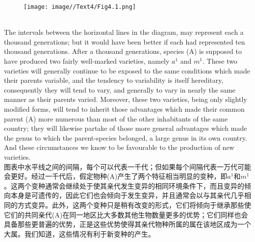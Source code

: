 \documentclass{article}
\begin{document}
\begin{figure}
    \centering
    \texttt{[image: image//Text4/Fig4.1.png]}
\end{figure}

\\
The intervals between the horizontal lines in the diagram, may represent each a thousand generations; but it would have been better if each had represented ten thousand generations. After a thousand generations, species (A) is supposed to have produced two fairly well-marked varieties, namely $a^1$ and $m^1$. These two varieties will generally continue to be exposed to the same conditions which made their parents variable, and the tendency to variability is itself hereditary, consequently they will tend to vary, and generally to vary in nearly the same manner as their parents varied. Moreover, these two varieties, being only slightly modified forms, will tend to inherit those advantages which made their common parent (A) more numerous than most of the other inhabitants of the same country; they will likewise partake of those more general advantages which made the genus to which the parent-species belonged, a large genus in its own country. And these circumstances we know to be favourable to the production of new varieties.\\
图表中水平线之间的间隔，每个可以代表一千代；但如果每个间隔代表一万代可能会更好。经过一千代后，假定物种(A)产生了两个特征相当明显的变种，即$a^1$和$m^1$。这两个变种通常会继续处于使其亲代发生变异的相同环境条件下，而且变异的倾向本身是可遗传的，因此它们也会倾向于发生变异，并且通常会以与其亲代几乎相同的方式变异。此外，这两个变种只是稍有改变的形式，它们将倾向于继承那些使它们的共同亲代(A)在同一地区比大多数其他生物数量更多的优势；它们同样也会具备那些更普遍的优势，正是这些优势使得其亲代物种所属的属在该地区成为一个大属。我们知道，这些情况有利于新变种的产生。 \\
\end{document}
